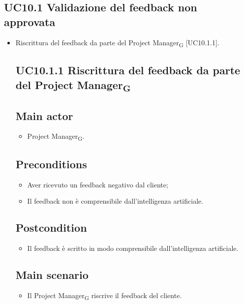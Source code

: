 \documentclass{article}
\begin{document}
    \subsection{UC10.1 Validazione del feedback non approvata}
    \begin{itemize}
        \item Riscrittura del feedback da parte del Project Manager\textsubscript{G}  [UC10.1.1].
        \subsection*{UC10.1.1 Riscrittura del feedback da parte del Project Manager\textsubscript{G} }
     \subsection*{Main actor}
         \begin{itemize}
             \item Project Manager\textsubscript{G}.
         \end{itemize}
     \subsection*{Preconditions} 
        \begin{itemize}
            \item Aver ricevuto un feedback negativo dal cliente;
            \item Il feedback non è comprensibile dall'intelligenza artificiale.
        \end{itemize}
        \subsection*{Postcondition} 
        \begin{itemize}
            \item Il feedback è scritto in modo comprensibile dall'intelligenza artificiale.
        \end{itemize}
        \subsection*{Main scenario}
        \begin{itemize}
        \item Il Project Manager\textsubscript{G} riscrive il feedback del cliente.
        \end{itemize}
    \end{itemize}
    
\end{document}
